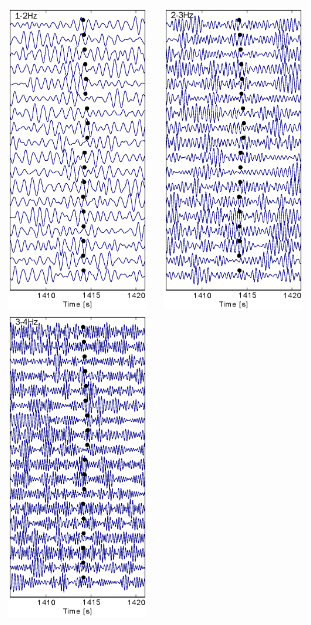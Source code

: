 \newpage

\begin{figure}[!ht]
	\centering
	\includegraphics[width=4cm,height=8cm]{fig/chap3/yka_e1_1_2.eps}
	\includegraphics[width=4cm,height=8cm]{fig/chap3/yka_e1_2_3.eps}
	\includegraphics[width=4cm,height=8cm]{fig/chap3/yka_e1_3_4.eps}\\

\end{figure}

